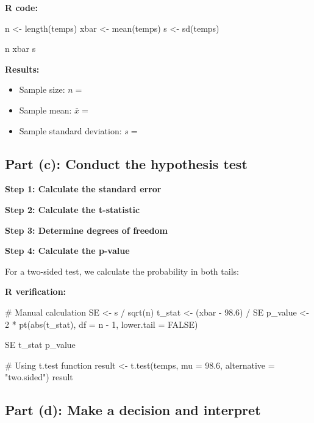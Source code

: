 \documentclass[11pt]{article}
\begin{document}
\textbf{R code:}
\begin{rcode}
n <- length(temps)
xbar <- mean(temps)
s <- sd(temps)

n
xbar
s
\end{rcode}

\textbf{Results:}
\begin{itemize}
\item Sample size: $n = $
\item Sample mean: $\bar{x} = $
\item Sample standard deviation: $s = $
\end{itemize}

\vspace{1cm}

\subsection*{Part (c): Conduct the hypothesis test}

\textbf{Step 1: Calculate the standard error}

\vspace{2cm}

\textbf{Step 2: Calculate the t-statistic}

\vspace{2cm}

\textbf{Step 3: Determine degrees of freedom}

\vspace{1cm}

\textbf{Step 4: Calculate the p-value}

For a two-sided test, we calculate the probability in both tails:

\vspace{1cm}

\textbf{R verification:}
\begin{rcode}
# Manual calculation
SE <- s / sqrt(n)
t_stat <- (xbar - 98.6) / SE
p_value <- 2 * pt(abs(t_stat), df = n - 1, lower.tail = FALSE)

SE
t_stat
p_value

# Using t.test function
result <- t.test(temps, mu = 98.6, alternative = "two.sided")
result
\end{rcode}

\vspace{1cm}

\subsection*{Part (d): Make a decision and interpret}
\end{document}
